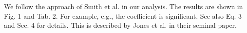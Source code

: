 We follow the approach of Smith et al. in our analysis. The results are shown in Fig. 1 and Tab. 2. For example, e.g., the coefficient is significant. See also Eq. 3 and Sec. 4 for details. This is described by Jones et al. in their seminal paper.
